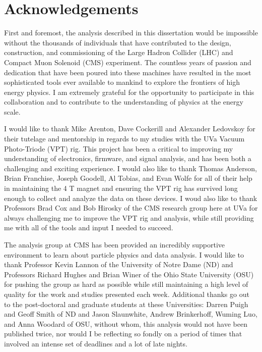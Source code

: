 \chapter{Acknowledgements}
\label{acknowledgements_overview}

\par First and foremost, the analysis described in this dissertation
would be impossible without the thousands of individuals that have
contributed to the design, construction, and commissioning of the
Large Hadron Collider (LHC) and Compact Muon Solenoid (CMS)
experiment.  The countless years of passion and dedication that have
been poured into these machines have resulted in the most
sophisticated tools ever available to mankind to explore the frontiers
of high energy physics.  I am extremely grateful for the opportunity
to participate in this collaboration and to contribute to the
understanding of physics at the \TeV energy scale.  

\par I would like to thank Mike Arenton, Dave Cockerill and Alexander
Ledovskoy for their tutelage and mentorship in regards to my studies
with the UVa Vacuum Photo-Triode (VPT) rig.  This project has been a
critical to improving my understanding of electronics, firmware, and
signal analysis, and has been both a challenging and exciting
experience.  I would also like to thank Thomas Anderson, Brian
Franchise, Joseph Goodell, Al Tobias, and Evan Wolfe for all of their help in
maintaining the 4 T magnet and ensuring the VPT rig has survived long
enough to collect and analyze the data on these devices.  I woud also
like to thank Professors Brad Cox and Bob Hirosky of the CMS research
group here at UVa for always challenging me to improve the VPT rig and
analysis, while still providing me with all of the tools and input I
needed to succeed.   

\par The \ttH analysis group at CMS has been provided an incredibly
supportive environment to learn about particle physics and data
analysis.  I would like to thank Professor Kevin Lannon of the
University of Notre Dame (ND) and Professors Richard Hughes and Brian
Winer of the Ohio State University (OSU) for pushing the group as hard
as possible while still maintaining a high level of quality for the
work and studies presented each week. Additional thanks go out to the
post-doctoral and graduate students at these Universities: Darren
Puigh and Geoff Smith of ND and Jason Slaunwhite, Andrew Brinkerhoff,
Wuming Luo, and Anna Woodard of OSU, without whom, this analysis would
not have been published twice, nor would I be reflecting so fondly on
a period of times that involved an intense set of deadlines and a lot
of late nights.  

